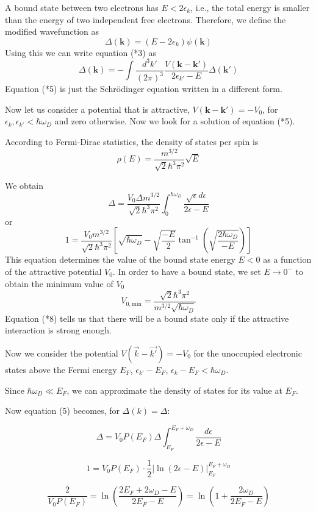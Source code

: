 \documentclass{article}
\begin{document}
A bound state between two electrons has $E < 2\epsilon_k$, i.e., the total energy is smaller than the energy of two independent free electrons. Therefore, we define the modified wavefunction as
\[
\Delta(\mathbf{k}) = (E - 2\epsilon_k) \psi(\mathbf{k}) \tag{*4}
\]
Using this we can write equation (*3) as
\[
\Delta(\mathbf{k}) = - \int \frac{d^3 k'}{(2\pi)^3} \frac{V(\mathbf{k} - \mathbf{k'})}{2\epsilon_{k'} - E} \Delta(\mathbf{k'}) \tag{*5}
\]
Equation (*5) is just the Schrödinger equation written in a different form.

Now let us consider a potential that is attractive, $V(\mathbf{k} - \mathbf{k'}) = -V_0$, for $\epsilon_k, \epsilon_{k'} < \hbar \omega_D$ and zero otherwise. Now we look for a solution of equation (*5).

According to Fermi-Dirac statistics, the density of states per spin is
\[
\rho(E) = \frac{m^{3/2}}{\sqrt{2} \hbar^3 \pi^2} \sqrt{E} \tag{*6}
\]

We obtain
\[
\Delta = \frac{V_0 \Delta m^{3/2}}{\sqrt{2} \hbar^3 \pi^2} \int_0^{\hbar \omega_D} \frac{\sqrt{\epsilon} d\epsilon}{2\epsilon - E} \tag{*7}
\]
or
\[
1 = \frac{V_0 m^{3/2}}{\sqrt{2} \hbar^3 \pi^2} \left[ \sqrt{\hbar \omega_D} - \sqrt{\frac{-E}{2}} \tan^{-1}\left( \sqrt{\frac{2\hbar \omega_D}{-E}} \right) \right]
\]
This equation determines the value of the bound state energy $E < 0$ as a function of the attractive potential $V_0$. In order to have a bound state, we set $E \to 0^-$ to obtain the minimum value of $V_0$
\[
V_{0, \text{min}} = \frac{\sqrt{2} \hbar^3 \pi^2}{m^{3/2} \sqrt{\hbar \omega_D}} \tag{*8}
\]
Equation (*8) tells us that there will be a bound state only if the attractive interaction is strong enough.

Now we consider the potential \( V(\vec{k} - \vec{k'}) = -V_0 \) for the unoccupied electronic states above the Fermi energy \( E_F \), \( \epsilon_{k'} - E_F \), \( \epsilon_k - E_F < \hbar \omega_D \).

Since \( \hbar \omega_D \ll E_F \), we can approximate the density of states for its value at \( E_F \).

Now equation (5) becomes, for \( \Delta(k) = \Delta \):

\[
\Delta = V_0 P(E_F) \Delta \int_{E_F}^{E_F + \omega_D} \frac{d\epsilon}{2\epsilon - E}
\]

\[
1 = V_0 P(E_F) \cdot \frac{1}{2} \left| \ln(2\epsilon - E) \right|_{E_F}^{E_F + \omega_D}
\]

\[
\frac{2}{V_0 P(E_F)} = \ln \left( \frac{2E_F + 2\omega_D - E}{2E_F - E} \right) = \ln \left( 1 + \frac{2\omega_D}{2E_F - E} \right)
\]
\end{document}
